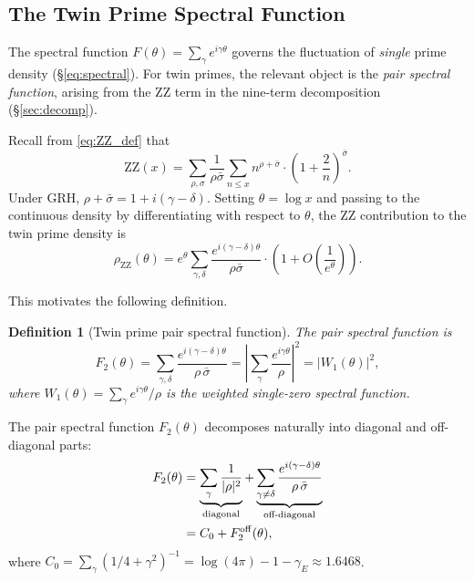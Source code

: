 \documentclass[11pt,a4paper]{article}
\newtheorem{definition}[theorem]{Definition}
\theoremstyle{remark}
\begin{document}
\subsection{The Twin Prime Spectral Function}

The spectral function $F(\theta) = \sum_\gamma e^{i\gamma\theta}$ governs the fluctuation of \emph{single} prime density (\S\ref{eq:spectral}).
For twin primes, the relevant object is the \emph{pair spectral function}, arising from the ZZ term in the nine-term decomposition (\S\ref{sec:decomp}).

Recall from \eqref{eq:ZZ_def} that
\[
\mathrm{ZZ}(x) = \sum_{\rho,\sigma}\frac{1}{\rho\bar\sigma}\sum_{n\le x}n^{\rho+\bar\sigma}\cdot\left(1+\frac{2}{n}\right)^{\!\bar\sigma}.
\]
Under GRH, $\rho+\bar\sigma = 1+i(\gamma-\delta)$.
Setting $\theta = \log x$ and passing to the continuous density by differentiating with respect to $\theta$, the ZZ contribution to the twin prime density is
\begin{equation}\label{eq:zz_density}
\rho_{\mathrm{ZZ}}(\theta) = e^{\theta}\sum_{\gamma,\delta}\frac{e^{i(\gamma-\delta)\theta}}{\rho\bar\sigma}\cdot\left(1+O\!\left(\frac{1}{e^\theta}\right)\right).
\end{equation}

This motivates the following definition.

\begin{definition}[Twin prime pair spectral function]\label{def:pair_spectral}
The \emph{pair spectral function} is
\begin{equation}\label{eq:pair_spectral}
\boxed{F_2(\theta) = \sum_{\gamma,\delta}\frac{e^{i(\gamma-\delta)\theta}}{\rho\,\bar\sigma} = \left|\sum_\gamma \frac{e^{i\gamma\theta}}{\rho}\right|^2 = |W_1(\theta)|^2,}
\end{equation}
where $W_1(\theta) = \sum_\gamma e^{i\gamma\theta}/\rho$ is the weighted single-zero spectral function.
\end{definition}

The pair spectral function $F_2(\theta)$ decomposes naturally into diagonal and off-diagonal parts:
\begin{align}
F_2(\theta) &= \underbrace{\sum_\gamma \frac{1}{|\rho|^2}}_{\text{diagonal}} + \underbrace{\sum_{\gamma\ne\delta}\frac{e^{i(\gamma-\delta)\theta}}{\rho\,\bar\sigma}}_{\text{off-diagonal}} \notag\\
&= C_0 + F_2^{\mathrm{off}}(\theta), \label{eq:F2_decomp}
\end{align}
where $C_0 = \sum_\gamma(1/4+\gamma^2)^{-1} = \log(4\pi)-1-\gamma_E \approx 1.6468$.
\end{document}

